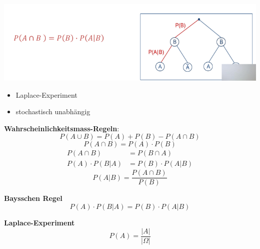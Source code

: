 \documentclass[11pt,twoside,landscape]{article}
\begin{document}
\begin{multicols}{3}
\begin{center}
\end{center}
\begin{center}
\includegraphics[width=.9\linewidth]{static/img/exev/w06-wahrscheinlichkeit-bedingte.png}
\end{center}

\begin{itemize}
\item Laplace-Experiment
\item stochastisch unabhängig
\end{itemize}

\textbf{Wahrscheinlichkeitsmass-Regeln}:
\begin{equation*}
P(A \cup B) = P(A) + P(B) - P(A \cap B)
\end{equation*}
\begin{equation*}
P(A \cap B) = P(A) \cdot P(B)
\end{equation*}
\begin{align*}
P(A \cap B) &= P(B \cap A) \\
P(A) \cdot P(B|A) &= P(B) \cdot P(A|B)
\end{align*}
\begin{equation*}
P(A|B) = \frac{P(A \cap B)}{P(B)}
\end{equation*}

\textbf{Baysschen Regel}
\begin{equation*}
P(A) \cdot P(B|A) = P(B) \cdot P(A|B)
\end{equation*}

\textbf{Laplace-Experiment}
\begin{equation*}
P(A) = \frac{|A|}{|\Omega|}
\end{equation*}


\end{multicols}
\end{document}
